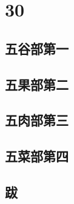 \documentclass[a4paper,12pt,UTF8,twoside]{ctexbook}
\begin{document}
\part{30}
\chapter{五谷部第一}
\chapter{五果部第二}
\chapter{五肉部第三}

\chapter{五菜部第四}

\backmatter

\chapter{跋}
\end{document}

